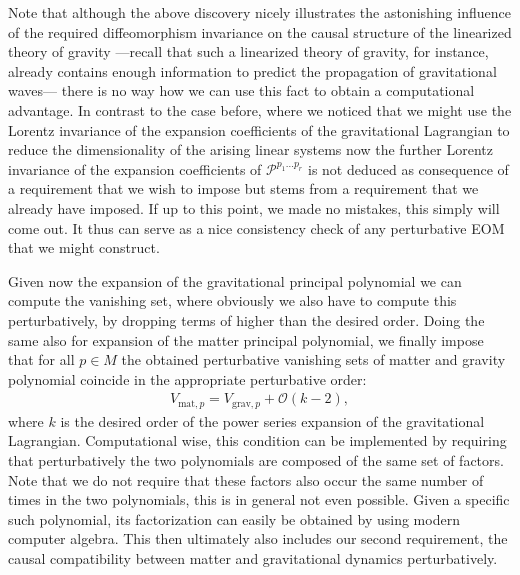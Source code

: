 Note that although the above discovery nicely illustrates the astonishing influence of the required diffeomorphism invariance on the causal structure of the linearized theory of gravity ---recall that such a linearized theory of gravity, for instance, already contains enough information to predict the propagation of gravitational waves--- there is no way how we can use this fact to obtain a computational advantage. In contrast to the case before, where we noticed that we might use the Lorentz invariance of the expansion coefficients of the gravitational Lagrangian to reduce the dimensionality of the arising linear systems now the further Lorentz invariance of the expansion coefficients of $\mathcal{P}^{p_1...p_r}$ is not deduced as consequence of a requirement that we wish to impose but stems from a  requirement that we already have imposed. If up to this point, we made no mistakes, this simply will come out. It thus can serve as a nice consistency check of any perturbative EOM that we might construct.

Given now the expansion of the gravitational principal polynomial we can compute the vanishing set, where obviously we also have to compute this perturbatively, by dropping terms of higher than the desired order. Doing the same also for expansion of the matter principal polynomial, we finally impose that for all $p \in M$ the obtained perturbative vanishing sets of matter and gravity polynomial coincide in the appropriate perturbative order:
\begin{align}
  V_{\text{mat},p} = V_{\text{grav},p} + \mathcal{O}(k-2),
\end{align}
where $k$ is the desired order of the power series expansion of the gravitational Lagrangian.
Computational wise, this condition can be implemented by requiring that perturbatively the two polynomials are composed of the same set of factors. Note that we do not require that these factors also occur the same number of times in the two polynomials, this is in general not even possible.
Given a specific such polynomial, its factorization can easily be obtained by using modern computer algebra.
This then ultimately also includes our second requirement, the causal compatibility between matter and gravitational dynamics perturbatively. 

